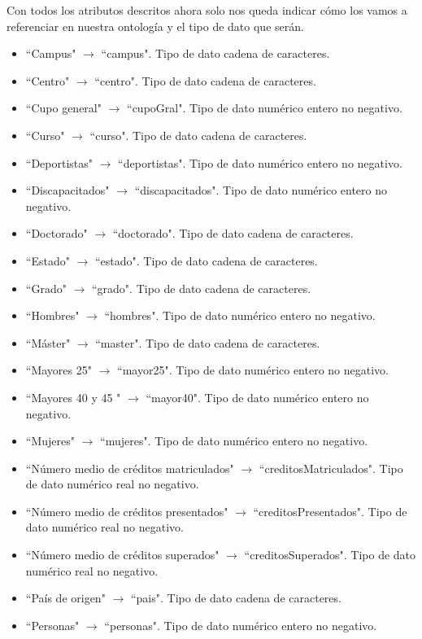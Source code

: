 Con todos los atributos descritos ahora solo nos queda indicar cómo los vamos a referenciar en nuestra ontología y el tipo de dato que serán.

\begin{itemize}
	\item ``Campus" $\rightarrow$ ``campus". Tipo de dato cadena de caracteres.
	\item ``Centro" $\rightarrow$ ``centro". Tipo de dato cadena de caracteres.
	\item ``Cupo general" $\rightarrow$ ``cupoGral". Tipo de dato numérico entero no negativo.
	\item ``Curso" $\rightarrow$ ``curso". Tipo de dato cadena de caracteres.
	\item ``Deportistas" $\rightarrow$ ``deportistas". Tipo de dato numérico entero no negativo.
	\item ``Discapacitados" $\rightarrow$ ``discapacitados". Tipo de dato numérico entero no negativo.
	\item ``Doctorado" $\rightarrow$ ``doctorado". Tipo de dato cadena de caracteres.
	\item ``Estado" $\rightarrow$ ``estado". Tipo de dato cadena de caracteres.
	\item ``Grado" $\rightarrow$ ``grado". Tipo de dato cadena de caracteres.
	\item ``Hombres" $\rightarrow$ ``hombres". Tipo de dato numérico entero no negativo.
	\item ``Máster" $\rightarrow$ ``master". Tipo de dato cadena de caracteres.
	\item ``Mayores 25" $\rightarrow$ ``mayor25". Tipo de dato numérico entero no negativo.
	\item ``Mayores 40 y 45 " $\rightarrow$ ``mayor40". Tipo de dato numérico entero no negativo.
	\item ``Mujeres" $\rightarrow$ ``mujeres". Tipo de dato numérico entero no negativo.
	\item ``Número medio de créditos matriculados" $\rightarrow$ ``creditosMatriculados". Tipo de dato numérico real no negativo.
	\item ``Número medio de créditos presentados" $\rightarrow$ ``creditosPresentados". Tipo de dato numérico real no negativo.
	\item ``Número medio de créditos superados" $\rightarrow$ ``creditosSuperados". Tipo de dato numérico real no negativo.
	\item ``País de origen" $\rightarrow$ ``pais". Tipo de dato cadena de caracteres.
	\item ``Personas" $\rightarrow$ ``personas". Tipo de dato numérico entero no negativo.

\end{itemize}
